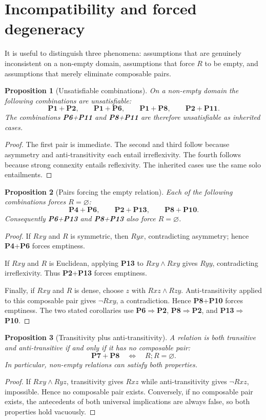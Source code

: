 \documentclass[11pt,a4paper,reqno]{amsart}
\newtheorem{proposition}{Proposition}[section]
\theoremstyle{definition}
\theoremstyle{remark}
\newcommand{\prop}[1]{\textbf{P#1}}
\newcommand{\catentails}{\Rightarrow}
\begin{document}
\section{Incompatibility and forced degeneracy}\label{sec:incompat}

It is useful to distinguish three phenomena: assumptions that are genuinely
inconsistent on a non-empty domain, assumptions that force $R$ to be empty,
and assumptions that merely eliminate composable pairs.

\begin{proposition}[Unsatisfiable combinations]\label{prop:unsat}
On a non-empty domain the following combinations are unsatisfiable:
\[
\prop{1}+\prop{2},\qquad
\prop{1}+\prop{6},\qquad
\prop{1}+\prop{8},\qquad
\prop{2}+\prop{11}.
\]
The combinations \prop{6}+\prop{11} and \prop{8}+\prop{11} are therefore
unsatisfiable as inherited cases.
\end{proposition}
\begin{proof}
The first pair is immediate.  The second and third follow because asymmetry and
anti-transitivity each entail irreflexivity.  The fourth follows because strong
connexity entails reflexivity.  The inherited cases use the same solo
entailments.
\end{proof}

\begin{proposition}[Pairs forcing the empty relation]\label{prop:forceempty}
Each of the following combinations forces $R=\varnothing$:
\[
\prop{4}+\prop{6},\qquad
\prop{2}+\prop{13},\qquad
\prop{8}+\prop{10}.
\]
Consequently \prop{6}+\prop{13} and \prop{8}+\prop{13} also force
$R=\varnothing$.
\end{proposition}
\begin{proof}
If $Rxy$ and $R$ is symmetric, then $Ryx$, contradicting asymmetry; hence
\prop{4}+\prop{6} forces emptiness.

If $Rxy$ and $R$ is Euclidean, applying \prop{13} to
$Rxy\wedge Rxy$ gives $Ryy$, contradicting irreflexivity.  Thus
\prop{2}+\prop{13} forces emptiness.

Finally, if $Rxy$ and $R$ is dense, choose $z$ with $Rxz\wedge Rzy$.
Anti-transitivity applied to this composable pair gives $\neg Rxy$, a
contradiction.  Hence \prop{8}+\prop{10} forces emptiness.  The two stated
corollaries use \prop{6}$\catentails$\prop{2},
\prop{8}$\catentails$\prop{2}, and \prop{13}$\catentails$\prop{10}.
\end{proof}

\begin{proposition}[Transitivity plus anti-transitivity]\label{prop:p7p8}
A relation is both transitive and anti-transitive if and only if it has no
composable pair:
\[
\prop{7}+\prop{8}\quad\Longleftrightarrow\quad R;R=\varnothing.
\]
In particular, non-empty relations can satisfy both properties.
\end{proposition}
\begin{proof}
If $Rxy\wedge Ryz$, transitivity gives $Rxz$ while anti-transitivity gives
$\neg Rxz$, impossible.  Hence no composable pair exists.  Conversely, if no
composable pair exists, the antecedents of both universal implications are
always false, so both properties hold vacuously.
\end{proof}
\end{document}
